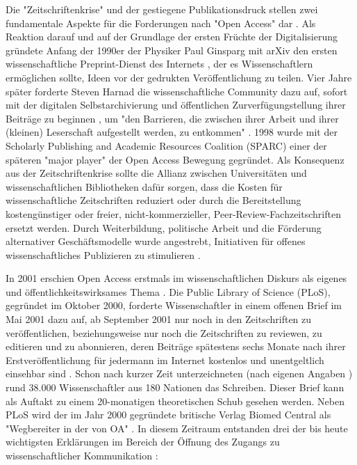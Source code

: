 Die "Zeitschriftenkrise" und der gestiegene Publikationsdruck stellen zwei fundamentale Aspekte für die Forderungen nach "Open Access" dar \cite{Brintzinger_2010}. Als Reaktion darauf und auf der Grundlage der ersten Früchte der Digitalisierung gründete Anfang der 1990er der Physiker Paul Ginsparg mit arXiv den ersten wissenschaftliche Preprint-Dienst des Internets \cite{suchen}, der es Wissenschaftlern ermöglichen sollte, Ideen vor der gedrukten Veröffentlichung zu teilen. Vier Jahre später forderte Steven Harnad die wissenschaftliche Community dazu auf, sofort mit der digitalen Selbstarchivierung und öffentlichen Zurverfügungstellung ihrer Beiträge zu beginnen \cite{albert_2006_open_implications}, um "den Barrieren, die zwischen ihrer Arbeit und ihrer (kleinen) Leserschaft aufgestellt werden, zu entkommen" \cite{harnad_1995_subversive_proposal}. 1998 wurde mit der Scholarly Publishing and Academic Resources Coalition (SPARC) einer der späteren "major player" der Open Access Bewegung \cite{russell2008business} \cite{Herb_2012} gegründet. Als Konsequenz aus der Zeitschriftenkrise sollte die Allianz zwischen Universitäten und wissenschaftlichen Bibliotheken dafür sorgen, dass die Kosten für wissenschaftliche Zeitschriften reduziert oder durch die Bereitstellung kostengünstiger oder freier, nicht-kommerzieller, Peer-Review-Fachzeitschriften ersetzt werden. Durch Weiterbildung, politische Arbeit und die Förderung alternativer Geschäftsmodelle wurde angestrebt, Initiativen für offenes wissenschaftliches Publizieren zu stimulieren \cite{suchen}.

In 2001 erschien Open Access erstmals im wissenschaftlichen Diskurs als eigenes und öffentlichkeitswirksames Thema \cite{cite:19}. Die Public Library of Science (PLoS), gegründet im Oktober 2000, forderte Wissenschaftler in einem offenen Brief im Mai 2001 dazu auf, ab September 2001 nur noch in den Zeitschriften zu veröffentlichen, beziehungsweise nur noch die Zeitschriften zu reviewen, zu editieren und zu abonnieren, deren Beiträge spätestens sechs Monate nach ihrer Erstveröffentlichung für jedermann im Internet kostenlos und unentgeltlich einsehbar sind \cite{cite:20}. Schon nach kurzer Zeit unterzeichneten (nach eigenen Angaben \cite{cite:19a}) rund 38.000 Wissenschaftler aus 180 Nationen das Schreiben. Dieser Brief kann als Auftakt zu einem 20-monatigen theoretischen Schub gesehen werden. Neben PLoS wird der im Jahr 2000 gegründete britische Verlag Biomed Central als "Wegbereiter in der von OA" \cite{suchen-Hoffmann-Zugang-undVerwertung-öffentlicher-Informationen}. In diesem Zeitraum entstanden drei der bis heute wichtigsten Erklärungen im Bereich der Öffnung des Zugangs zu wissenschaftlicher Kommunikation \cite{CREATe_2014}: 

